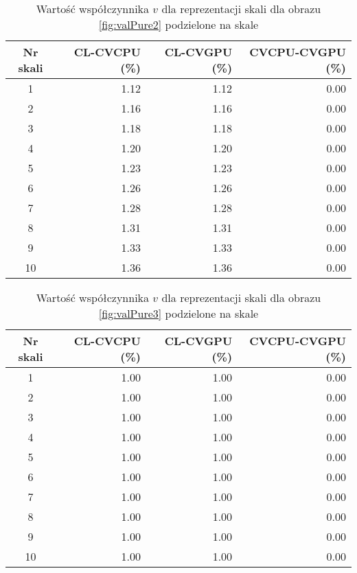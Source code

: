 \begin{center}
\begin{table}
\centering
\caption{Wartość współczynnika $ v $ dla reprezentacji skali dla obrazu \ref{fig:valPure2} podzielone na skale}
\label{tab:devScaleRep2}
\begin{tabular}{|c|r|r|r|}
\hline
Nr skali & CL-CVCPU (\%) & CL-CVGPU (\%) & CVCPU-CVGPU (\%) \\ \hline
1        & 1.12     & 1.12     & 0.00        \\ \hline
2        & 1.16     & 1.16     & 0.00        \\ \hline
3        & 1.18     & 1.18     & 0.00        \\ \hline
4        & 1.20     & 1.20     & 0.00        \\ \hline
5        & 1.23     & 1.23     & 0.00        \\ \hline
6        & 1.26     & 1.26     & 0.00        \\ \hline
7        & 1.28     & 1.28     & 0.00        \\ \hline
8        & 1.31     & 1.31     & 0.00        \\ \hline
9        & 1.33     & 1.33     & 0.00        \\ \hline
10       & 1.36     & 1.36     & 0.00        \\ \hline
\end{tabular}
\end{table}
\end{center}

\begin{center}
\begin{table}
\centering
\caption{Wartość współczynnika $ v $ dla reprezentacji skali dla obrazu \ref{fig:valPure3} podzielone na skale}
\label{tab:devScaleRep3}
\begin{tabular}{|c|r|r|r|}
\hline
Nr skali & CL-CVCPU (\%) & CL-CVGPU (\%) & CVCPU-CVGPU (\%) \\ \hline
1        & 1.00     & 1.00     & 0.00        \\ \hline
2        & 1.00     & 1.00     & 0.00        \\ \hline
3        & 1.00     & 1.00     & 0.00        \\ \hline
4        & 1.00     & 1.00     & 0.00        \\ \hline
5        & 1.00     & 1.00     & 0.00        \\ \hline
6        & 1.00     & 1.00     & 0.00        \\ \hline
7        & 1.00     & 1.00     & 0.00        \\ \hline
8        & 1.00     & 1.00     & 0.00        \\ \hline
9        & 1.00     & 1.00     & 0.00        \\ \hline
10       & 1.00     & 1.00     & 0.00        \\ \hline
\end{tabular}
\end{table}
\end{center}

